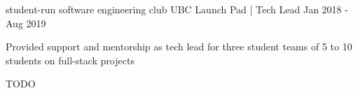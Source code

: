 \begin{cventries}

  \cventry
    {student-run software engineering club} %
    {UBC Launch Pad | Tech Lead} %
    {} %
    {
        Jan 2018 - Aug 2019
    } %
    {
      \begin{cvitems} %
        \item {Provided support and mentorship as tech lead for three student teams of 5 to 10 students on full-stack projects}
        \item {TODO}
      \end{cvitems}
    }

\iffalse
  \cventry
    {the organization behind western Canada's largest hackathon, nwHacks} %
    {nwPlus | Web Developer} %
    {\linktext{2019.nwhacks.io}} %
    {May 2018 - Sept 2018} %
    {
      \begin{cvitems} %
        \item {Implemented the nwHacks 2019 website and applicant management system used by 1000+ users}
      \end{cvitems}
    }
\fi


\end{cventries}
